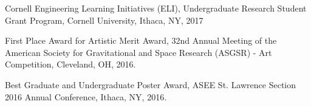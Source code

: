 

\begin{cvitems}
\vspace{10pt}
\paragraphstyle
\item Cornell Engineering Learning Initiatives (ELI), Undergraduate Research Student Grant Program, Cornell University, Ithaca, NY, 2017
\item First Place Award for Artistic Merit Award, 32nd Annual Meeting of the American Society for Gravitational and Space Research (ASGSR) - Art Competition, Cleveland, OH, 2016.
\item Best Graduate and Undergraduate Poster Award, ASEE St. Lawrence Section 2016 Annual Conference, Ithaca, NY, 2016.


\end{cvitems}
\vspace{10pt}